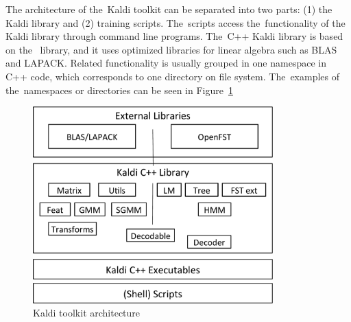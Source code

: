 The architecture of the~Kaldi toolkit can be separated into two parts: (1) the Kaldi library and (2) training scripts.
The~scripts access the~functionality of the Kaldi library through command line programs.
The~C++ Kaldi library is based on the~\cite{allauzen2007openfst} library, and it uses optimized libraries for linear algebra such as BLAS and LAPACK.
Related functionality is usually grouped in one namespace in C++ code, which corresponds to one directory on file system. 
The~examples of the~namespaces or directories can be seen in Figure~\ref{fig:kaldi_arch}

\begin{figure}[!htp]
    \begin{center}
        \includegraphics[width=25em]{images/kaldi-lib}
        \caption{Kaldi toolkit architecture\cite{povey2011kaldi}}
        \label{fig:kaldi_arch} 
    \end{center}
\end{figure}

